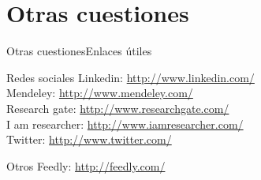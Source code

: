 \documentclass{beamer}
\begin{document}
\section{Otras cuestiones}
\begin{frame}{Otras cuestiones}{Enlaces útiles}
	\begin{block}{Redes sociales}
	Linkedin: \url{http://www.linkedin.com/}\\
	Mendeley: \url{http://www.mendeley.com/}\\
	Research gate: \url{http://www.researchgate.com/}\\
	I am researcher: \url{http://www.iamresearcher.com/}\\
	Twitter: \url{http://www.twitter.com/}
	\end{block}
	\begin{block}{Otros}
	Feedly: \url{http://feedly.com/}
	\end{block}
\end{frame}
\end{document}
